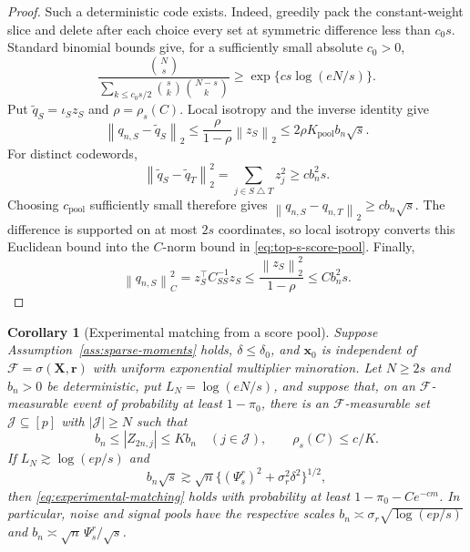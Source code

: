 \documentclass[a4paper,11pt,english]{article}
\newtheorem{corollary}[theorem]{Corollary}
\newcommand{\norm}[1]{\left\lVert #1\right\rVert}
\begin{document}
\begin{proof}
Such a deterministic code exists.  Indeed, greedily pack the
constant-weight slice and delete after each choice every set at symmetric
difference less than $c_0s$.  Standard binomial bounds give, for a
sufficiently small absolute $c_0>0$,
\begin{equation*}
 \frac{\binom Ns}
 {\sum_{k\le c_0s/2}\binom sk\binom{N-s}{k}}
 \ge \exp\{cs\log(eN/s)\}.
\end{equation*}
Put $\widetilde q_S=\iota_Sz_S$ and $\rho=\rho_s(C)$.  Local isotropy
and the inverse identity give
\begin{equation*}
 \norm{q_{n,S}-\widetilde q_S}_2
 \le\frac{\rho}{1-\rho}\norm{z_S}_2
 \le2\rho K_{\mathrm{pool}}b_n\sqrt s.
\end{equation*}
For distinct codewords,
\begin{equation*}
 \norm{\widetilde q_S-\widetilde q_T}_2^2
 =\sum_{j\in S\mathbin\triangle T}z_j^2
 \ge cb_n^2s.
\end{equation*}
Choosing $c_{\mathrm{pool}}$ sufficiently small therefore gives
$\norm{q_{n,S}-q_{n,T}}_2\ge cb_n\sqrt s$.  The difference is supported
on at most $2s$ coordinates, so local isotropy converts this Euclidean
bound into the $C$-norm bound in \eqref{eq:top-s-score-pool}.  Finally,
\begin{equation*}
 \norm{q_{n,S}}_C^2=z_S^\top C_{SS}^{-1}z_S
 \le\frac{\norm{z_S}_2^2}{1-\rho}
 \le Cb_n^2s.
\end{equation*}
\end{proof}

\begin{corollary}[Experimental matching from a score pool]
\label{cor:experimental-pool-matching}
Suppose Assumption~\ref{ass:sparse-moments} holds, $\delta\le\delta_0$,
and $\mathbf x_0$ is independent of
$\mathcal F=\sigma(\mathbf X,\mathbf r)$ with uniform exponential
multiplier minoration.  Let $N\ge2s$ and $b_n>0$ be deterministic, put
$L_N=\log(eN/s)$, and suppose that, on an $\mathcal F$-measurable event
of probability at least $1-\pi_0$, there is an $\mathcal F$-measurable
set $\mathcal J\subseteq[p]$ with
$|\mathcal J|\ge N$ such that
\begin{equation*}
 b_n\le |Z_{2n,j}|\le Kb_n\quad(j\in\mathcal J),
 \qquad \rho_s(C)\le c/K .
\end{equation*}
If $L_N\gtrsim\log(ep/s)$ and
\begin{equation*}
 b_n\sqrt s\gtrsim
 \sqrt n\{(\Psi_s^r)^2+\sigma_r^2\delta^2\}^{1/2},
\end{equation*}
then \eqref{eq:experimental-matching} holds with probability at least
$1-\pi_0-Ce^{-cm}$.  In particular, noise and signal pools have the
respective scales $b_n\asymp\sigma_r\sqrt{\log(ep/s)}$ and
$b_n\asymp\sqrt n\,\Psi_s^r/\sqrt s$.
\end{corollary}
\end{document}
